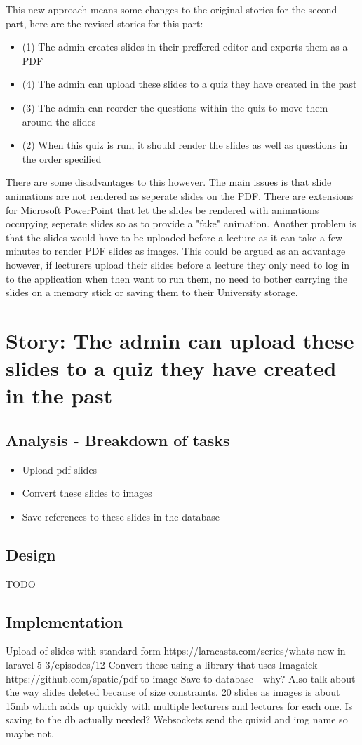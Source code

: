 \documentclass{article}
\begin{document}
This new approach means some changes to the original stories for the second part, here are the revised stories for this part:
\begin{itemize}
	\item (1) The admin creates slides in their preffered editor and exports them as a PDF
	\item (4) The admin can upload these slides to a quiz they have created in the past
	\item (3) The admin can reorder the questions within the quiz to move them around the slides
	\item (2) When this quiz is run, it should render the slides as well as questions in the order specified
\end{itemize}

There are some disadvantages to this however. The main issues is that slide animations are not rendered as seperate slides on the PDF. There are extensions for Microsoft PowerPoint that let the slides be rendered with animations occupying seperate slides so as to provide a "fake" animation. Another problem is that the slides would have to be uploaded before a lecture as it can take a few minutes to render PDF slides as images. This could be argued as an advantage however, if lecturers upload their slides before a lecture they only need to log in to the application when then want to run them, no need to bother carrying the slides on a memory stick or saving them to their University storage.
\newpage

\section{Story: The admin can upload these slides to a quiz they have created in the past}
\subsection{Analysis - Breakdown of tasks}
\begin{itemize}
	\item Upload pdf slides
	\item Convert these slides to images
	\item Save references to these slides in the database
\end{itemize}
\subsection{Design}
TODO
\subsection{Implementation}
Upload of slides with standard form https://laracasts.com/series/whats-new-in-laravel-5-3/episodes/12
Convert these using a library that uses Imagaick - https://github.com/spatie/pdf-to-image
Save to database - why? Also talk about the way slides deleted because of size constraints. 20 slides as images is about 15mb which adds up quickly with multiple lecturers and lectures for each one. Is saving to the db actually needed? Websockets send the quizid and img name so maybe not.
\end{document}
